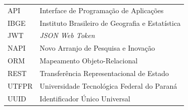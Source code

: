 \begin{tabular}{p{2.5cm}p{12.0cm}}
     API        & Interface de Programação de Aplicações \\
     IBGE       & Instituto Brasileiro de Geografia e Estatística \\
     JWT        & \textit{JSON Web Token} \\
     NAPI       & Novo Arranjo de Pesquisa e Inovação \\
     ORM        & Mapeamento Objeto-Relacional \\
     REST       & Transferência Representacional de Estado \\
     UTFPR      & Universidade Tecnológica Federal do Paraná \\
     UUID       & Identificador Único Universal \\
\end{tabular}
